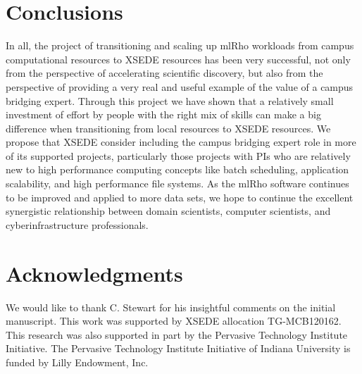 \documentclass{sig-alternate}
\begin{document}
\section{Conclusions}\label{sec:conclusion}

In all, the project of transitioning and scaling up mlRho workloads from campus computational resources
to XSEDE resources has been very successful, not only from the perspective of accelerating scientific
discovery, but also from the perspective of providing a very real and useful example of the value of a campus
bridging expert. Through this project we have shown that a relatively small investment of effort by people
with the right mix of skills can make a big difference when transitioning from local
resources to XSEDE resources. We propose that XSEDE consider including the campus bridging expert role in more
of its supported projects, particularly those projects with PIs who are relatively new to high performance
computing concepts like batch scheduling, application scalability, and high performance file systems. As the
mlRho software continues to be improved and applied to more data sets, we hope to continue the excellent
synergistic relationship between domain scientists, computer scientists, and cyberinfrastructure
professionals.


\section{Acknowledgments}
We would like to thank C. Stewart for his insightful comments on the initial manuscript. This work was
supported by XSEDE allocation TG-MCB120162. This research was also supported in part by the Pervasive
Technology Institute Initiative. The Pervasive Technology Institute Initiative of Indiana University is funded
by Lilly Endowment, Inc.
%

%
%
\end{document}
